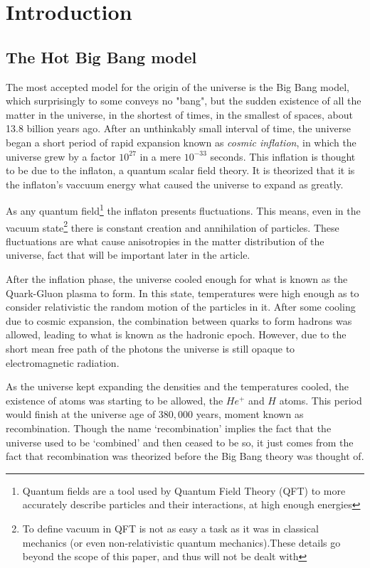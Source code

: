 \chapter{Introduction}

\section{The Hot Big Bang model}

The most accepted model for the origin of the universe is the Big Bang model, which surprisingly to some conveys no "bang", but the sudden existence of all the matter in the universe, in the shortest of times, in the smallest of spaces, about 13.8 billion years ago. After an unthinkably small interval of time, the universe began a short period of rapid expansion known as \textit{cosmic inflation}, in which the universe grew by a factor $10^{27}$ in a mere $10^{-33}$ seconds. This inflation is thought to be due to the inflaton, a quantum scalar field theory. It is theorized that it is the inflaton's vaccuum energy what caused the universe to expand as greatly.

As any quantum field\footnote{Quantum fields are a tool used by Quantum Field Theory (QFT) to more accurately describe particles and their interactions, at high enough energies} the inflaton presents fluctuations. This means, even in the vacuum state\footnote{To define vacuum in QFT is not as easy a task as it was in classical mechanics (or even non-relativistic quantum mechanics).These details go beyond the scope of this paper, and thus will not be dealt with} there is constant creation and annihilation of particles. These fluctuations are what cause anisotropies in the matter distribution of the universe, fact that will be important later in the article.

After the inflation phase, the universe cooled enough for what is known as the Quark-Gluon plasma to form. In this state, temperatures were high enough as to consider relativistic the random motion of the particles in it. After some cooling due to cosmic expansion, the combination between quarks to form hadrons was allowed, leading to what is known as the hadronic epoch. However, due to the short mean free path of the photons the universe is still opaque to electromagnetic radiation.

As the universe kept expanding the densities and the temperatures cooled, the existence of atoms was starting to be allowed, the $He^{+}$ and $H$ atoms. This period would finish at the universe age of $380,000$ years, moment known as recombination. Though the name `recombination' implies the fact that the universe used to be `combined' and then ceased to be so, it just comes from the fact that recombination was theorized before the Big Bang theory was thought of.

